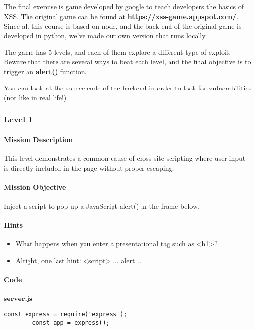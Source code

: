 
\begin{Exercise}[label={websec-xss-game}]
	The final exercise is game developed by google to teach developers the basics of XSS. The original game can be found at \textbf{https://xss-game.appspot.com/}. Since all this course is based on node, and the back-end of the original game is developed in python, we've made our own version that runs locally. 
	
	The game has 5 levels, and each of them explore a different type of exploit. Beware that there are several ways to beat each level, and the final objective is to trigger an \textbf{alert()} function.
	
	You can look at the source code of the backend in order to look for vulnerabilities (not like in real life!)
	
	\subsubsection{Level 1}
		\paragraph{Mission Description}
		This level demonstrates a common cause of cross-site scripting where user input is directly included in the page without proper escaping. 
		
		\paragraph{Mission Objective}
		Inject a script to pop up a JavaScript alert() in the frame below.
		
		\paragraph{Hints}
		\begin{itemize}
			\item What happens when you enter a presentational tag such as <h1>?
			\item Alright, one last hint: <script> ... alert ... 
		\end{itemize}
		
		\paragraph{Code}
		\textbf{server.js}
		\begin{lstlisting}[style=JavaScript]
		const express = require('express');
		const app = express();
		

\end{lstlisting}
\end{Exercise}
